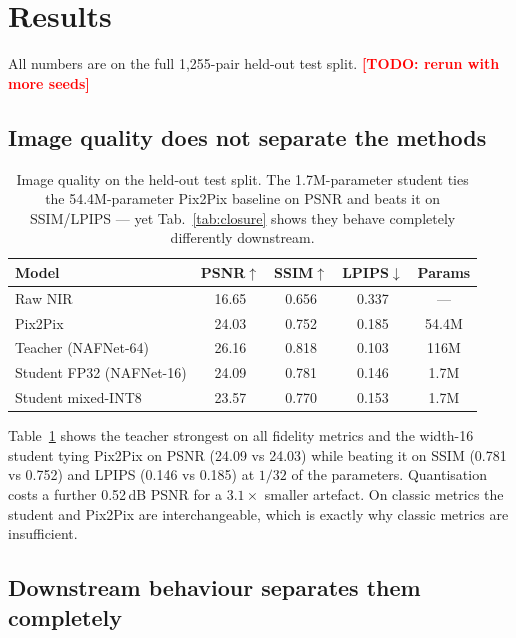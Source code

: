 \documentclass[10pt,twocolumn,letterpaper]{article}
\newcommand{\TODO}[1]{\textcolor{red}{\textbf{[TODO: #1]}}}
\begin{document}
\section{Results}
\label{sec:results}

All numbers are on the full 1{,}255-pair held-out test split. \TODO{rerun with more seeds}

\subsection{Image quality does not separate the methods}

\begin{table}[t]
\centering
\footnotesize
\setlength{\tabcolsep}{3.5pt}
\begin{tabular}{lcccc}
\toprule
\textbf{Model} & \textbf{PSNR}$\uparrow$ & \textbf{SSIM}$\uparrow$ & \textbf{LPIPS}$\downarrow$ & \textbf{Params} \\
\midrule
Raw NIR & 16.65 & 0.656 & 0.337 & --- \\
Pix2Pix~\cite{isola2017image} & 24.03 & 0.752 & 0.185 & 54.4M \\
Teacher (NAFNet-64) & 26.16 & 0.818 & 0.103 & 116M \\
Student FP32 (NAFNet-16) & 24.09 & 0.781 & 0.146 & 1.7M \\
Student mixed-INT8 & 23.57 & 0.770 & 0.153 & 1.7M \\
\bottomrule
\end{tabular}
\caption{Image quality on the held-out test split. The 1.7M-parameter student ties the 54.4M-parameter Pix2Pix baseline on PSNR and beats it on SSIM/LPIPS --- yet Tab.~\ref{tab:closure} shows they behave completely differently downstream.}
\label{tab:quality}
\end{table}

Table~\ref{tab:quality} shows the teacher strongest on all fidelity metrics and the width-16 student tying Pix2Pix on PSNR (24.09 vs 24.03) while beating it on SSIM (0.781 vs 0.752) and LPIPS (0.146 vs 0.185) at $1/32$ of the parameters. Quantisation costs a further 0.52\,dB PSNR for a $3.1\times$ smaller artefact. On classic metrics the student and Pix2Pix are interchangeable, which is exactly why classic metrics are insufficient.

\subsection{Downstream behaviour separates them completely}
\end{document}

